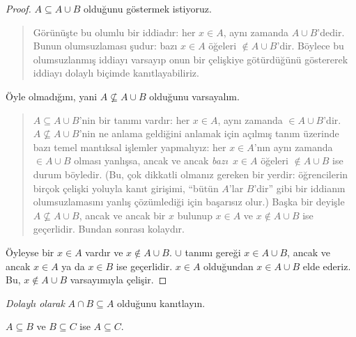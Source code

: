 \begin{proof}
  $A \subseteq A \cup B$ olduğunu göstermek istiyoruz.
  \begin{quote}
    Görünüşte bu olumlu bir iddiadır: her $x \in A$, aynı zamanda $A
    \cup B$'dedir. Bunun olumsuzlaması şudur: bazı $x \in A$ öğeleri
    $\notin A \cup B$'dir. Böylece bu olumsuzlanmış iddiayı varsayıp onun
    bir çelişkiye götürdüğünü göstererek iddiayı dolaylı biçimde
    kanıtlayabiliriz.
    \end{quote}
  Öyle olmadığını, yani $A \nsubseteq A \cup B$ olduğunu varsayalım.
  \begin{quote}
    $A \subseteq A \cup B$'nin bir tanımı vardır: her $x \in A$, aynı
    zamanda $\in A \cup B$'dir. $A \nsubseteq A \cup B$'nin ne anlama
    geldiğini anlamak için açılmış tanım üzerinde bazı temel mantıksal
    işlemler yapmalıyız: her $x \in A$'nın aynı zamanda $\in A \cup B$
    olması yanlışsa, ancak ve ancak \emph{bazı}~$x \in A$ öğeleri
    $\notin A \cup B$ ise durum böyledir. (Bu, çok dikkatli olmanız gereken bir
    yerdir: öğrencilerin birçok çelişki yoluyla kanıt girişimi, ``bütün
    $A$'lar $B$'dir'' gibi bir iddianın olumsuzlamasını yanlış çözümlediği
    için başarısız olur.) Başka bir deyişle $A \nsubseteq A \cup B$,
    ancak ve ancak bir $x$ bulunup $x \in A$ ve $x \notin A \cup B$ ise
    geçerlidir. Bundan sonrası kolaydır.
  \end{quote}
  Öyleyse bir $x \in A$ vardır ve $x \notin A \cup B$. $\cup$ tanımı
  gereği $x \in A \cup B$, ancak ve ancak $x \in
  A$ ya da $x \in B$ ise geçerlidir. $x \in A$ olduğundan $x \in A
  \cup B$ elde ederiz. Bu, $x \notin A \cup B$ varsayımıyla çelişir.
\end{proof}

\begin{prob}
\emph{Dolaylı olarak} $A \cap B \subseteq A$ olduğunu kanıtlayın.
\end{prob}

\begin{prop}
$A \subseteq B$ ve $B \subseteq C$ ise $A \subseteq C$.
\end{prop}

